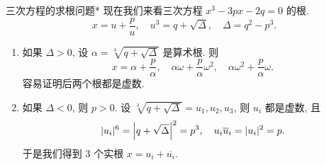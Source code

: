 \begin{frame}{三次方程的求根问题*}
\onslide<+->
现在我们来看三次方程 $x^3-3px-2q=0$ 的根.
\onslide<+->
\[x=u+\frac pu,\quad
u^3=q+\sqrt{\Delta},\quad 
\Delta=q^2-p^3.\]
\begin{enumerate}
\item 如果 $\Delta>0$, 设 $\alpha=\sqrt[3]{q+\sqrt{\Delta}}$ 是算术根.
\onslide<+->
则
\[x=\alpha+\frac p\alpha,\quad \alpha\omega+\frac p\alpha \omega^2,\quad \alpha\omega^2+\frac p\alpha \omega.\]
\onslide<+->
容易证明后两个根都是虚数.
\item 如果 $\Delta<0$, 则 $p>0$.
\onslide<+->
设 $\sqrt[3]{q+\sqrt{\Delta}}=u_1,u_2,u_3$,
\onslide<+->
则 $u_i$ 都是虚数, 且
\[|u_i|^6=\left|q+\sqrt{\Delta}\right|^2=p^3,\quad u_i\overline u_i=|u_i|^2=p.\]
\onslide<+->
于是我们得到 $3$ 个实根 $x=u_i+\overline{u_i}$.
\end{enumerate}
\end{frame}



